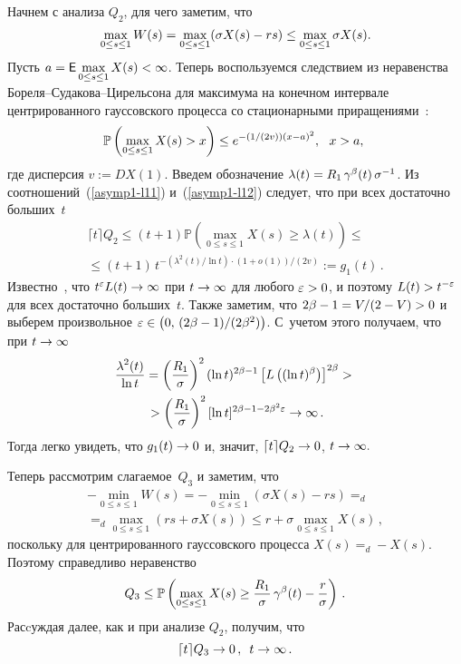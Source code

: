 \begin{multicols}{2}
 Начнем с анализа $Q_2$, для чего заметим, что
\begin{equation}
\hspace*{-1mm}\max\limits_{0 \leq s \leq 1}W(s)=\max\limits_{0 \leq s \leq 1}(\sigma X(s)-rs)
\leq \max\limits_{0 \leq s \leq 1}\sigma X(s). \!\!
\label{asymp1-l11}
\end{equation}
Пусть $a={\sf E} \max\limits_{0 \leq s \leq 1}X(s)<\infty$. Теперь
воспользуемся следствием из неравенства  Бо\-ре\-ля--Су\-да\-ко\-ва--Ци\-рель\-со\-на
для максимума на конечном интервале  центрированного гауссовского процесса со
стационарными приращениями~\cite{Adler}:
\begin{equation}
\hspace*{-1.5mm}\mathbb{P} \left( \max\limits_{0 \leq s \leq 1} X(s)> x \right) \leq
e^{-(1/(2v))(x-a)^2}, \ \ x>a,\!
\label{asymp1-l12}
\end{equation}
где дисперсия $v:=D X(1)$. Введем обозначение
$\lambda(t)\hm=R_1\,\gamma^\beta(t)\,\sigma^{-1}$. Из соотношений~(\ref{asymp1-l11})
и~(\ref{asymp1-l12}) следует, что при всех
достаточно больших~$t$
\begin{multline*}
\lceil t \rceil Q_2 \le  (t+1)\mathbb{P} \left( \max_{0 \leq s \leq 1}
X(s) \geq \lambda(t) \right)\leq{}\\
{}\leq (t+1)\,t^{-({\lambda^2(t)}/{\ln
t})\cdot (1+o(1))/(2v)} :=g_1(t)\,.
\end{multline*}
Известно~\cite{Seneta}, что   $t^\varepsilon L(t)\hm\to \infty $ при
$t\hm\to \infty$ для любого $\varepsilon\hm>0$, и поэтому
$L(t)\hm>t^{-\varepsilon}$ для всех  достаточно больших~$t$. Также
заметим, что $2\beta-1={V}/(2-V)\hm>0$ и выберем произвольное
$\varepsilon\hm\in \left(0,\,(2\beta-1)/(2\beta^2)\right)$. С~учетом этого
получаем, что при $t\hm\to \infty$
\begin{multline*}
\displaystyle\frac{\displaystyle \lambda^2(t)\mathstrut}{\displaystyle \ln t\mathstrut}=\left( \displaystyle\frac{\displaystyle R_1\mathstrut}{\displaystyle \sigma\mathstrut} \right)^2(\ln t)^{2\beta-1}
\left[L\left((\ln t)^\beta\right)\right] ^{2\beta}>{}\\
{}> \left( \displaystyle\frac{\displaystyle R_1\mathstrut}{\displaystyle \sigma\mathstrut} \right)^2 [\ln t]^{2\beta-1-2\beta^2
\varepsilon}\to \infty\,.
\end{multline*}
Тогда легко увидеть, что  $g_1(t) \hm\to  0$ и, значит, $ \lceil t
\rceil Q_2 \hm\to 0$, $t \hm\to \infty.$

 Теперь рассмотрим слагаемое~$Q_3$ и заметим, что
\begin{multline*}
-\min\limits_{0 \leq s \leq 1} W(s)=-\min\limits_{0 \leq s \leq 1} (\sigma
X(s)-rs)=_d{}\\
{}=_d\max\limits_{0 \leq s \leq 1} (rs+\sigma X(s))\leq
r+\sigma \max\limits_{0 \leq s \leq 1} X(s)\,,
\end{multline*}
поскольку для  центрированного гауссовского процесса $X(s)=_d -X(s)$.
Поэтому справедливо неравенство
$$
Q_3 \leq \mathbb{P} \left(\max\limits_{0 \leq s \leq 1}X(s) \geq
\displaystyle\frac{\displaystyle R_1\mathstrut}{\displaystyle \sigma\mathstrut}\, \gamma^\beta(t) - \displaystyle\frac{\displaystyle r\mathstrut}{\displaystyle \sigma\mathstrut}\right)\,.
$$
Расcуждая далее, как и при анализе $Q_2$, получим, что
$$
\lceil t \rceil Q_3 \to 0\,,\enskip t \to \infty\,.
$$


\end{multicols}
